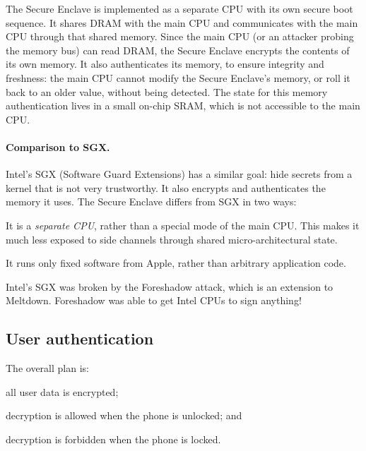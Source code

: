 The Secure Enclave is implemented as a separate CPU with its own secure
boot sequence.
It shares DRAM with the main CPU and communicates with the main CPU
through that shared memory.
Since the main CPU (or an attacker probing the memory bus) can read
DRAM, the Secure Enclave encrypts the contents of its own memory.
It also authenticates its memory, to ensure integrity and freshness:
the main CPU cannot modify the Secure Enclave's memory, or roll it back
to an older value, without being detected.
The state for this memory authentication lives in a small on-chip SRAM,
which is not accessible to the main CPU.

\paragraph{Comparison to SGX.}
Intel's SGX (Software Guard Extensions) has a similar goal: hide secrets from a
kernel that is not very trustworthy.
It also encrypts and authenticates the memory it uses.
The Secure Enclave differs from SGX in two ways:
\begin{compactitem}
  \item It is a \emph{separate CPU}, rather than a special mode of the
        main CPU.
        This makes it much less exposed to side channels through shared
        micro-architectural state.
  \item It runs only fixed software from Apple, rather than
        arbitrary application code.
\end{compactitem}
Intel's SGX was broken by the Foreshadow attack, which is an extension to Meltdown. Foreshadow was able to get Intel CPUs to sign anything!

\subsection{User authentication}

The overall plan is:
\begin{compactitem}
  \item all user data is encrypted;
  \item decryption is allowed when the phone is unlocked; and
  \item decryption is forbidden when the phone is locked.
\end{compactitem}

